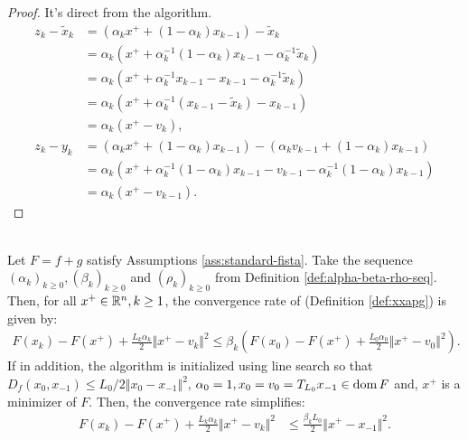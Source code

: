 \documentclass[12pt]{report}
\begin{document}
        \begin{proof}
            It's direct from the algorithm. 
            \begin{align*}
                z_k - \tilde x_k &= (\alpha_k x^+ + (1 - \alpha_k)x_{k - 1}) - \tilde x_k
                \\
                &= \alpha_k (x^+ + \alpha_k^{-1}(1 - \alpha_k)x_{k - 1} - \alpha_k^{-1}\tilde x_k)
                \\
                &= \alpha_k(x^+ + \alpha_k^{-1}x_{k - 1} - x_{k - 1} - \alpha_k^{-1}\tilde x_k)
                \\
                &= \alpha_k(x^+ + \alpha_k^{-1}(x_{k - 1} - \tilde x_k) - x_{k - 1})
                \\
                &= \alpha_k(x^+ - v_{k}), 
                \\
                z_k - y_k &= 
                (\alpha_k x^+ + (1 - \alpha_k)x_{k - 1}) - \left(
                    \alpha_k v_{k - 1} + (1 - \alpha_k)x_{k - 1}
                \right)
                \\
                &= \alpha_k(x^+ + \alpha_k^{-1}(1 - \alpha_k)x_{k - 1} - v_{k - 1} - \alpha_k^{-1}(1 - \alpha_k)x_{k - 1})
                \\
                &= \alpha_k(x^+ - v_{k - 1}). 
            \end{align*}
        \end{proof}
        \begin{theorem}\; \label{thm:xxapg-fxn-cnvg}\;\\
            Let $F = f + g$ satisfy Assumptions \ref{ass:standard-fista}. 
            Take the sequence $(\alpha_k)_{k \ge 0}, (\beta_k)_{k \ge 0}$ and $(\rho_k)_{k \ge 0}$ from Definition \ref{def:alpha-beta-rho-seq}. 
            Then, for all $x^+ \in \mathbb R^n, k \ge 1$, the convergence rate of \XXAPG{} (Definition \ref{def:xxapg}) is given by: 
            \begin{align*}
                F(x_k) - F(x^+) + \frac{L_k\alpha_k}{2}\Vert x^+ - v_k\Vert^2
                \le 
                \beta_k
                \left(
                    F(x_0) - F(x^+) + \frac{L_0\alpha_0}{2} \Vert x^+ - v_0\Vert^2
                \right). 
            \end{align*}
            If in addition, the algorithm is initialized using line search so that \mbox{$D_f(x_0, x_{-1}) \le L_0/2 \Vert x_0 - x_{-1}\Vert^2$}, $\alpha_0 = 1, x_0 = v_0 = T_{L_{0}}x_{-1} \in \operatorname{dom} F$ and, $x^+$ is a minimizer of $F$.
            Then, the convergence rate simplifies: 
            \begin{align*}
                F(x_k) - F(x^+) + \frac{L_k\alpha_k}{2}\Vert x^+ - v_k\Vert^2
                & \le 
                \frac{\beta_kL_0}{2}\Vert x^+ - x_{-1}\Vert^2. 
            \end{align*}
        \end{theorem}
\end{document}
